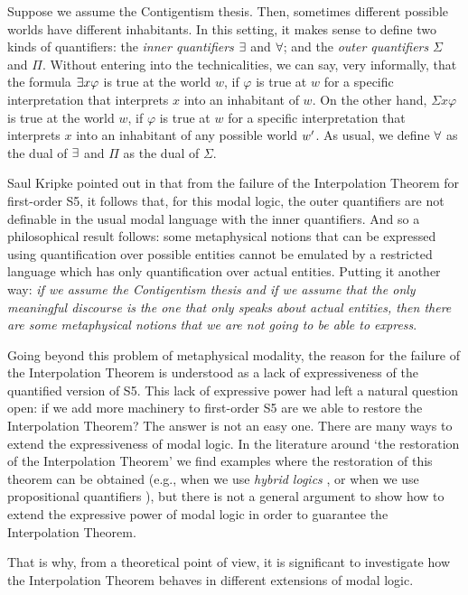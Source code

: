\qquad Suppose we assume the Contigentism thesis. Then, sometimes different possible worlds have different inhabitants. In this setting, it makes sense to define two kinds of quantifiers: the \textit{inner quantifiers} $\exists$ and $\forall$; and the \textit{outer quantifiers} $\Sigma$ and $\Pi$. Without entering into the technicalities, we can say, very informally, that the formula $\exists x \varphi$ is true at the world $w$, if $\varphi$ is true at $w$ for a specific interpretation that interprets $x$ into an inhabitant of $w$. On the other hand, $\Sigma x \varphi$ is true at the world $w$, if $\varphi$ is true at $w$ for a specific interpretation that interprets $x$ into an inhabitant of any possible world $w^{\prime}$. As usual, we define $\forall$ as the dual of $\exists$ and $\Pi$ as the dual of $\Sigma$.
 
\qquad Saul Kripke pointed out in \cite{Kripke83} that from the failure of the Interpolation Theorem for first-order S5, it follows that, for this modal logic, the outer quantifiers are not definable in the usual modal language with the inner quantifiers. And so a philosophical result follows: some metaphysical notions that can be expressed using quantification over possible entities cannot be emulated by a restricted language which has only quantification over actual entities. Putting it another way: \textit{if we assume the Contigentism thesis and if we assume that the only meaningful discourse is the one that only speaks about actual entities, then there are some metaphysical notions that we are not going to be able to express}.

\qquad Going beyond this problem of metaphysical modality, the reason for the failure of the Interpolation Theorem is understood as a lack of expressiveness of the quantified version of S5. This lack of expressive power had left a natural question open: if we add more machinery to first-order S5 are we able to restore the Interpolation Theorem? The answer is not an easy one. There are many ways to extend the expressiveness of modal logic. In the literature around `the restoration of the Interpolation Theorem' we find examples where the restoration of this theorem can be obtained (e.g., when we use \textit{hybrid logics} \cite{Areces01}, or when we use propositional quantifiers \cite{Fitting02}), but there is not a general argument to show how to extend the expressive power of modal logic in order to guarantee the Interpolation Theorem.

\qquad That is why, from a theoretical point of view, it is significant to investigate how the Interpolation Theorem behaves in different extensions of modal logic.


